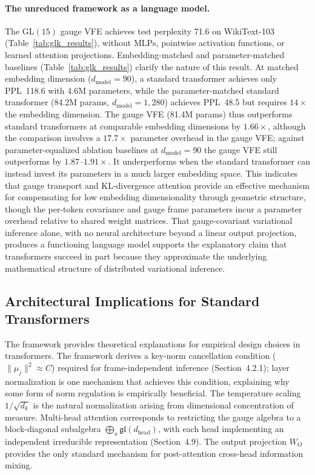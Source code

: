 \documentclass[twoside,11pt]{article}
\begin{document}
\paragraph{The unreduced framework as a language model.} The $\mathrm{GL}(15)$ gauge VFE achieves test perplexity 71.6 on WikiText-103 (Table~\ref{tab:glk_results}), without MLPs, pointwise activation functions, or learned attention projections. Embedding-matched and parameter-matched baselines (Table~\ref{tab:glk_results}) clarify the nature of this result. At matched embedding dimension ($d_{\text{model}} = 90$), a standard transformer achieves only PPL~118.6 with 4.6M parameters, while the parameter-matched standard transformer (84.2M params, $d_{\text{model}} = 1{,}280$) achieves PPL~48.5 but requires $14\times$ the embedding dimension. The gauge VFE (81.4M params) thus outperforms standard transformers at comparable embedding dimensions by $1.66\times$, although the comparison involves a $17.7\times$ parameter overhead in the gauge VFE; against parameter-equalized ablation baselines at $d_{\text{model}}=90$ the gauge VFE still outperforms by $1.87$--$1.91\times$. It underperforms when the standard transformer can instead invest its parameters in a much larger embedding space. This indicates that gauge transport and KL-divergence attention provide an effective mechanism for compensating for low embedding dimensionality through geometric structure, though the per-token covariance and gauge frame parameters incur a parameter overhead relative to shared weight matrices. That gauge-covariant variational inference alone, with no neural architecture beyond a linear output projection, produces a functioning language model supports the explanatory claim that transformers succeed in part because they approximate the underlying mathematical structure of distributed variational inference.



\subsection{Architectural Implications for Standard Transformers}

The framework provides theoretical explanations for empirical design choices in transformers. The framework derives a key-norm cancellation condition ($\|\mu_j\|^2 \approx C$) required for frame-independent inference (Section~4.2.1); layer normalization is one mechanism that achieves this condition, explaining why some form of norm regulation is empirically beneficial. The temperature scaling $1/\sqrt{d_k}$ is the natural normalization arising from dimensional concentration of measure. Multi-head attention corresponds to restricting the gauge algebra to a block-diagonal subalgebra $\bigoplus_a \mathfrak{gl}(d_{\mathrm{head}})$, with each head implementing an independent irreducible representation (Section~4.9). The output projection $W_O$ provides the only standard mechanism for post-attention cross-head information mixing.
\end{document}
